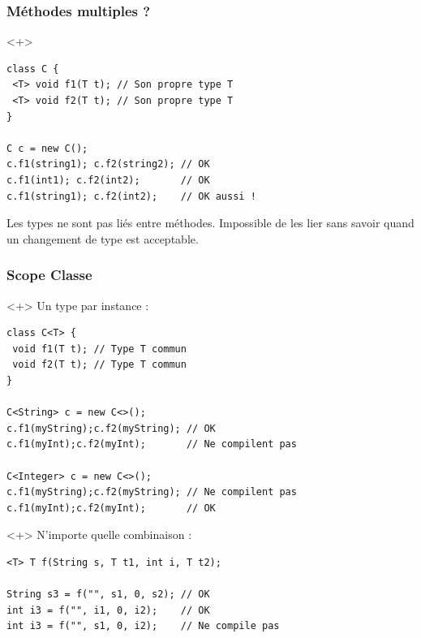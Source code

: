 \documentclass[draft]{beamer}
\begin{document}
\begin{frame}[fragile]
\frametitle{Méthodes multiples ?}
\begin{onlyenv}<+>
\begin{lstlisting}
class C {
 <T> void f1(T t); // Son propre type T
 <T> void f2(T t); // Son propre type T
}

C c = new C();
c.f1(string1); c.f2(string2); // OK
c.f1(int1); c.f2(int2);       // OK
c.f1(string1); c.f2(int2);    // OK aussi !
\end{lstlisting}
Les types ne sont pas liés entre méthodes.
Impossible de les lier sans savoir quand un changement de type est acceptable.
\end{onlyenv}
\end{frame}

\begin{frame}[fragile]
\frametitle{Scope Classe}
\begin{onlyenv}<+>
Un type par instance :
\begin{lstlisting}
class C<T> {
 void f1(T t); // Type T commun
 void f2(T t); // Type T commun
}

C<String> c = new C<>();
c.f1(myString);c.f2(myString); // OK
c.f1(myInt);c.f2(myInt);       // Ne compilent pas

C<Integer> c = new C<>();
c.f1(myString);c.f2(myString); // Ne compilent pas
c.f1(myInt);c.f2(myInt);       // OK
\end{lstlisting}
\end{onlyenv}
\begin{onlyenv}<+>
N'importe quelle combinaison :
\begin{lstlisting}
<T> T f(String s, T t1, int i, T t2);

String s3 = f("", s1, 0, s2); // OK
int i3 = f("", i1, 0, i2);    // OK
int i3 = f("", s1, 0, i2);    // Ne compile pas
\end{lstlisting}
\end{onlyenv}
\end{frame}
\end{document}
